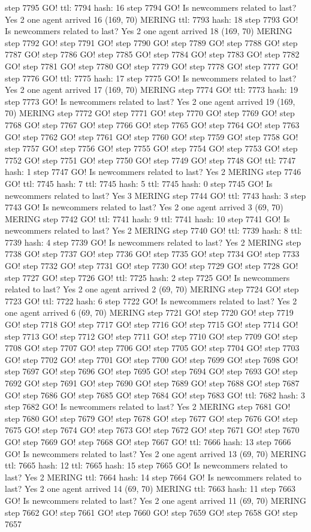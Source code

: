 step 7795 GO! ttl: 7794 hash: 16 step 7794 GO! Is newcommers related to last? Yes 2 one agent arrived 16 (169, 70) MERING ttl: 7793 hash: 18 step 7793 GO! Is newcommers related to last? Yes 2 one agent arrived 18 (169, 70) MERING step 7792 GO! step 7791 GO! step 7790 GO! step 7789 GO! step 7788 GO! step 7787 GO! step 7786 GO! step 7785 GO! step 7784 GO! step 7783 GO! step 7782 GO! step 7781 GO! step 7780 GO! step 7779 GO! step 7778 GO! step 7777 GO! step 7776 GO! ttl: 7775 hash: 17 step 7775 GO! Is newcommers related to last? Yes 2 one agent arrived 17 (169, 70) MERING step 7774 GO! ttl: 7773 hash: 19 step 7773 GO! Is newcommers related to last? Yes 2 one agent arrived 19 (169, 70) MERING step 7772 GO! step 7771 GO! step 7770 GO! step 7769 GO! step 7768 GO! step 7767 GO! step 7766 GO! step 7765 GO! step 7764 GO! step 7763 GO! step 7762 GO! step 7761 GO! step 7760 GO! step 7759 GO! step 7758 GO! step 7757 GO! step 7756 GO! step 7755 GO! step 7754 GO! step 7753 GO! step 7752 GO! step 7751 GO! step 7750 GO! step 7749 GO! step 7748 GO! ttl: 7747 hash: 1 step 7747 GO! Is newcommers related to last? Yes 2 MERING step 7746 GO! ttl: 7745 hash: 7 ttl: 7745 hash: 5 ttl: 7745 hash: 0 step 7745 GO! Is newcommers related to last? Yes 3 MERING step 7744 GO! ttl: 7743 hash: 3 step 7743 GO! Is newcommers related to last? Yes 2 one agent arrived 3 (69, 70) MERING step 7742 GO! ttl: 7741 hash: 9 ttl: 7741 hash: 10 step 7741 GO! Is newcommers related to last? Yes 2 MERING step 7740 GO! ttl: 7739 hash: 8 ttl: 7739 hash: 4 step 7739 GO! Is newcommers related to last? Yes 2 MERING step 7738 GO! step 7737 GO! step 7736 GO! step 7735 GO! step 7734 GO! step 7733 GO! step 7732 GO! step 7731 GO! step 7730 GO! step 7729 GO! step 7728 GO! step 7727 GO! step 7726 GO! ttl: 7725 hash: 2 step 7725 GO! Is newcommers related to last? Yes 2 one agent arrived 2 (69, 70) MERING step 7724 GO! step 7723 GO! ttl: 7722 hash: 6 step 7722 GO! Is newcommers related to last? Yes 2 one agent arrived 6 (69, 70) MERING step 7721 GO! step 7720 GO! step 7719 GO! step 7718 GO! step 7717 GO! step 7716 GO! step 7715 GO! step 7714 GO! step 7713 GO! step 7712 GO! step 7711 GO! step 7710 GO! step 7709 GO! step 7708 GO! step 7707 GO! step 7706 GO! step 7705 GO! step 7704 GO! step 7703 GO! step 7702 GO! step 7701 GO! step 7700 GO! step 7699 GO! step 7698 GO! step 7697 GO! step 7696 GO! step 7695 GO! step 7694 GO! step 7693 GO! step 7692 GO! step 7691 GO! step 7690 GO! step 7689 GO! step 7688 GO! step 7687 GO! step 7686 GO! step 7685 GO! step 7684 GO! step 7683 GO! ttl: 7682 hash: 3 step 7682 GO! Is newcommers related to last? Yes 2 MERING step 7681 GO! step 7680 GO! step 7679 GO! step 7678 GO! step 7677 GO! step 7676 GO! step 7675 GO! step 7674 GO! step 7673 GO! step 7672 GO! step 7671 GO! step 7670 GO! step 7669 GO! step 7668 GO! step 7667 GO! ttl: 7666 hash: 13 step 7666 GO! Is newcommers related to last? Yes 2 one agent arrived 13 (69, 70) MERING ttl: 7665 hash: 12 ttl: 7665 hash: 15 step 7665 GO! Is newcommers related to last? Yes 2 MERING ttl: 7664 hash: 14 step 7664 GO! Is newcommers related to last? Yes 2 one agent arrived 14 (69, 70) MERING ttl: 7663 hash: 11 step 7663 GO! Is newcommers related to last? Yes 2 one agent arrived 11 (69, 70) MERING step 7662 GO! step 7661 GO! step 7660 GO! step 7659 GO! step 7658 GO! step 7657 